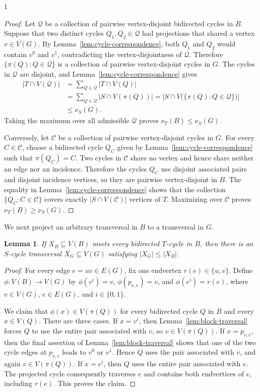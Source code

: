 \documentclass[a4paper,11pt]{article}
\theoremstyle{plain}
\newtheorem{lemma}[theorem]{Lemma}
\theoremstyle{definition}
\theoremstyle{remark}
\newcommand{\cC}{\mathcal{C}}
\newcommand{\cQ}{\mathcal{Q}}
\begin{document}
\begin{spacing}{1}
\begin{proof}
Let $\cQ$ be a collection of pairwise vertex-disjoint bidirected cycles in
$B$.  Suppose that two distinct cycles $Q_1,Q_2\in\cQ$ had projections that
shared a vertex $v\in V(G)$.  By Lemma~\ref{lem:cycle-correspondence}, both
$Q_1$ and $Q_2$ would contain $v^0$ and $v^1$, contradicting the
vertex-disjointness of $\cQ$.  Therefore
$\{\pi(Q):Q\in\cQ\}$ is a collection of pairwise vertex-disjoint cycles in
$G$.  The cycles in $\cQ$ are disjoint, and Lemma~\ref{lem:cycle-correspondence}
gives
\[
\begin{split}
  |T\cap V(\cQ)|
  &=\sum_{Q\in\cQ}|T\cap V(Q)|\\
  &=\sum_{Q\in\cQ}|S\cap V(\pi(Q))|
   =\left|S\cap V\bigl(\{\pi(Q):Q\in\cQ\}\bigr)\right|\\
  &\leq \nu_S(G).
\end{split}
\]
Taking the maximum over all admissible $\cQ$ proves
$\nu_T(B)\leq\nu_S(G)$.

Conversely, let $\cC$ be a collection of pairwise vertex-disjoint cycles in
$G$.  For every $C\in\cC$, choose a bidirected cycle $Q_C$
given by Lemma~\ref{lem:cycle-correspondence} such that $\pi(Q_C)=C$.  Two
cycles in $\cC$ share no vertex and hence share neither an edge nor an
incidence.  Therefore the cycles $Q_C$ use disjoint associated pairs and
disjoint incidence vertices, so they are pairwise vertex-disjoint in $B$.
The equality in Lemma~\ref{lem:cycle-correspondence} shows that the collection
$\{Q_C:C\in\cC\}$ covers exactly $|S\cap V(\cC)|$ vertices of $T$.
Maximizing over $\cC$ proves $\nu_T(B)\geq\nu_S(G)$.
\end{proof}

We next project an arbitrary transversal in $B$ to a transversal in $G$.

\begin{lemma}\label{lem:transversal}
If $X_B\subseteq V(B)$ meets every bidirected $T$-cycle in $B$, then there is
an $S$-cycle transversal $X_G\subseteq V(G)$ satisfying
$|X_G|\leq|X_B|$.
\end{lemma}

\begin{proof}
For every edge $e=uv\in E(G)$, fix one endvertex $r(e)\in\{u,v\}$.  Define
$\phi:V(B)\to V(G)$ by $\phi(v^i)=v$, $\phi(p_{v,e})=v$, and
$\phi(e^i)=r(e)$, where $v\in V(G)$, $e\in E(G)$, and $i\in\{0,1\}$.

We claim that $\phi(x)\in V(\pi(Q))$ for every bidirected cycle $Q$ in $B$
and every $x\in V(Q)$.  There are three cases.  If $x=v^i$, then
Lemma~\ref{lem:block-traversal} forces $Q$ to use the entire pair associated
with $v$, so $v\in V(\pi(Q))$.  If $x=p_{v,e}$, then the final assertion of
Lemma~\ref{lem:block-traversal} shows that one of the two cycle edges at
$p_{v,e}$ leads to $v^0$ or $v^1$.  Hence $Q$ uses the pair associated with
$v$, and again $v\in V(\pi(Q))$.  If $x=e^i$, then $Q$ uses the entire pair
associated with $e$.  The projected cycle consequently traverses $e$ and
contains both endvertices of $e$, including $r(e)$.  This proves the claim.


\end{proof}
\end{spacing}
\end{document}
